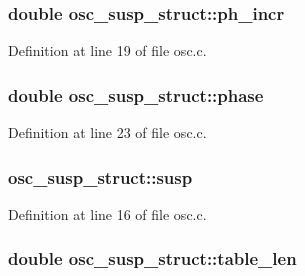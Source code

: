 \subsubsection[{\texorpdfstring{ph\+\_\+incr}{ph_incr}}]{\setlength{\rightskip}{0pt plus 5cm}double osc\+\_\+susp\+\_\+struct\+::ph\+\_\+incr}\hypertarget{structosc__susp__struct_a10e5fc85317199ce83579f2870e5ae6e}{}\label{structosc__susp__struct_a10e5fc85317199ce83579f2870e5ae6e}


Definition at line 19 of file osc.\+c.

\subsubsection[{\texorpdfstring{phase}{phase}}]{\setlength{\rightskip}{0pt plus 5cm}double osc\+\_\+susp\+\_\+struct\+::phase}\hypertarget{structosc__susp__struct_abdaad2fcf19d332561e9ce071005ba5c}{}\label{structosc__susp__struct_abdaad2fcf19d332561e9ce071005ba5c}


Definition at line 23 of file osc.\+c.

\subsubsection[{\texorpdfstring{susp}{susp}}]{ osc\+\_\+susp\+\_\+struct\+::susp}\hypertarget{structosc__susp__struct_a1cc08ea2dff8ac9cfb259d15a7c7f485}{}\label{structosc__susp__struct_a1cc08ea2dff8ac9cfb259d15a7c7f485}


Definition at line 16 of file osc.\+c.

\subsubsection[{\texorpdfstring{table\+\_\+len}{table_len}}]{\setlength{\rightskip}{0pt plus 5cm}double osc\+\_\+susp\+\_\+struct\+::table\+\_\+len}\hypertarget{structosc__susp__struct_aea4b8fbb22977eb5c4a4f8482f0036ae}{}\label{structosc__susp__struct_aea4b8fbb22977eb5c4a4f8482f0036ae}


